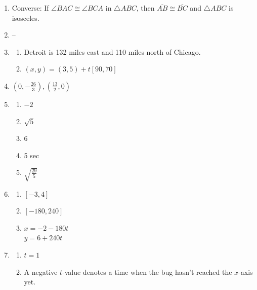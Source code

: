\documentclass{article}
\begin{document}
\begin{enumerate}
\item Converse: If $\angle BAC \cong \angle BCA$ in $\triangle ABC$, then $\overline{AB} \cong \overline{BC}$ and $\triangle ABC$ is isosceles.

\item --

\item \begin{enumerate}

	\item Detroit is 132 miles east and 110 miles north of Chicago.
	
	\item $(x, y) = (3,5) + t[90, 70]$
	
	\end{enumerate}
	
\item $(0, -\frac{26}{3}), (\frac{13}{2}, 0)$

\item \begin{enumerate}

	\item $-2$
	
	\item $\sqrt{5}$
	
	\item $6$
	
	\item 5 sec
	
	\item $\sqrt{\frac{29}{5}}$

	\end{enumerate}
	
\item \begin{enumerate}

	\item $[-3, 4]$
	
	\item $[-180, 240]$
	
	\item $x = -2 - 180t$ \\
		$y = 6 + 240t$

	\end{enumerate}
	
\item \begin{enumerate}

	\item $t = 1$
	
	\item A negative $t$-value denotes a time when the bug hasn't reached the $x$-axis yet.
	

\end{enumerate}
\end{enumerate}
\end{document}

